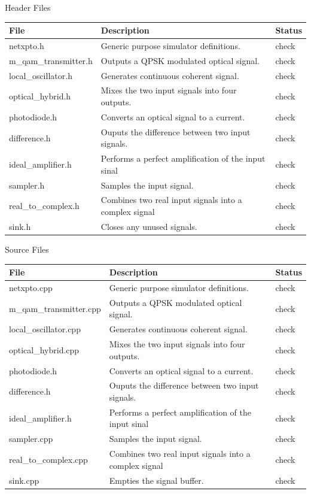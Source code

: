 Header Files
\begin{table}[H]
\centering
\begin{tabulary}{1.0\textwidth}{|L|L|l|}
\hline
\textbf{File}			& \textbf{Description}									& {\bf Status}\\
\hline
netxpto.h               & Generic purpose simulator definitions.				& check\\
\hline
m\_qam\_transmitter.h   & Outputs a QPSK modulated optical signal.				& check\\
\hline
local\_oscillator.h     & Generates continuous coherent signal.					& check\\
\hline
optical\_hybrid.h       & Mixes the two input signals into four outputs.		& check\\
\hline
photodiode.h            & Converts an optical signal to a current.				& check\\
\hline
difference.h            & Ouputs the difference between two input signals.		& check\\
\hline
ideal\_amplifier.h		& Performs a perfect amplification of the input sinal	& check\\
\hline
sampler.h               & Samples the input signal.								& check\\
\hline
real\_to\_complex.h		& Combines two real input signals into a complex signal	& check\\
\hline
sink.h                  & Closes any unused signals.							& check\\
\hline
\end{tabulary}
\end{table}
%
%
Source Files
\begin{table}[H]
\centering
\begin{tabulary}{1.0\textwidth}{|L|L|l|}
\hline
\textbf{File}			& \textbf{Description}									& {\bf Status}\\
\hline
netxpto.cpp				& Generic purpose simulator definitions.				& check\\
\hline
m\_qam\_transmitter.cpp	& Outputs a QPSK modulated optical signal.				& check\\
\hline
local\_oscillator.cpp	& Generates continuous coherent signal.					& check\\
\hline
optical\_hybrid.cpp		& Mixes the two input signals into four outputs.		& check\\
\hline
photodiode.h			& Converts an optical signal to a current.				& check\\
\hline
difference.h			& Ouputs the difference between two input signals.		& check\\
\hline
ideal\_amplifier.h		& Performs a perfect amplification of the input sinal	& check\\
\hline
sampler.cpp				& Samples the input signal.								& check\\
\hline
real\_to\_complex.cpp	& Combines two real input signals into a complex signal	& check\\
\hline
sink.cpp				& Empties the signal buffer.							& check\\
\hline
\end{tabulary}
\end{table}



